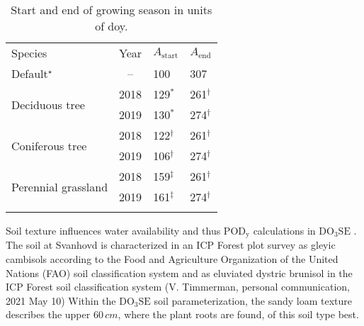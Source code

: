 \documentclass[bg, manuscript]{copernicus}
\begin{document}
\begin{table}[t]
  \caption{Start and end of growing season in units of \unit{doy}.}
  \label{tab:sensitivity_tests_gs}
  \begin{tabular}{lcll}
    \tophline
    Species & Year & $A_\mathrm{start}$ & $A_\mathrm{end}$\\
    \middlehline
    Default$^\star$ & -- & 100 & 307\\
    \multirow{2}{*}{Deciduous tree} & 2018 & 129$^*$ & 261$^\dagger$ \\
    & 2019 & 130$^*$ & 274$^\dagger$ \\
    \multirow{2}{*}{Coniferous tree} & 2018 & 122$^\dagger$ & 261$^\dagger$ \\
    & 2019 & 106$^\dagger$ & 274$^\dagger$ \\
    \multirow{2}{*}{Perennial grassland} & 2018 & 159$^\ddagger$ & 261$^\dagger$\\
    & 2019 & 161$^\ddagger$ & 274$^\dagger$ \\
    \bottomhline
  \end{tabular}
\end{table}

Soil texture influences water availability and thus $\mathrm{POD_y}$ calculations in $\mathrm{DO_3SE}$ \citep{ACP:Bueker2012}. The soil at Svanhovd is characterized in an ICP Forest plot survey as gleyic cambisols according to the Food and Agriculture Organization of the United Nations (FAO) soil classification system and as eluviated dystric brunisol in the ICP Forest soil classification system (V. Timmerman, personal communication, 2021 May 10) Within the $\mathrm{DO_3SE}$ soil parameterization, the sandy loam texture describes the upper $60\,\unit{cm}$, where the plant roots are found, of this soil type best. 
\end{document}
